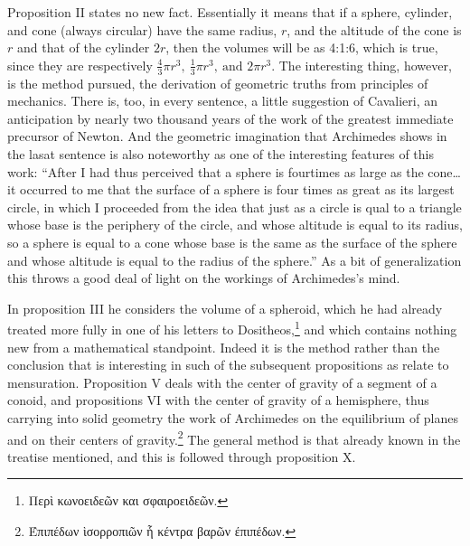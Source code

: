 \documentclass[oneside,12pt]{book}
\begin{document}
Proposition II states no new fact. Essentially it means that if a sphere, cylinder, and cone (always circular) have the same radius, $r$, and the altitude of the cone is $r$ and that of the cylinder $2r$, then the volumes will be as 4:1:6, which is true, since they are respectively $\frac{4}{3}\pi r^3,\ \frac{1}{3}\pi r^3,\ \text{and } 2\pi r^3$. The interesting thing, however, is the method pursued, the derivation of geometric truths from principles of mechanics. There is, too, in every sentence, a little suggestion of Cavalieri, an anticipation by nearly two thousand years of the work of the greatest immediate precursor of Newton. And the geometric imagination that Archimedes shows in the lasat sentence is also noteworthy as one of the interesting features of this work: ``After I had thus perceived that a sphere is fourtimes as large as the cone\dots it occurred to me that the surface of a sphere is four times as great as its largest circle, in which I proceeded from the idea that just as a circle is qual to a triangle whose base is the periphery of the circle, and whose altitude is equal to its radius, so a sphere is equal to a cone whose base is the same as the surface of the sphere and whose altitude is equal to the radius of the sphere.'' As a bit of generalization this throws a good deal of light on the workings of Archimedes's mind. \par 

In proposition III he considers the volume of a spheroid, which he had already treated more fully in one of his letters to Dositheos,\footnote{Περὶ κωνοειδεῶν και σφαιροειδεῶν.} and which contains nothing new from a mathematical standpoint. Indeed it is the method rather than the conclusion that is interesting in such of the subsequent propositions as relate to mensuration. Proposition V deals with the center of gravity of a segment of a conoid, and propositions VI with the center of gravity of a hemisphere, thus carrying into solid geometry the work of Archimedes on the equilibrium of planes and on their centers of gravity.\footnote{Έπιπέδων ὶσορροπιῶν ἧ κέντρα βαρῶν έπιπέδων.} The general method is that already known in the treatise mentioned, and this is followed through proposition X. \par 
\end{document}
